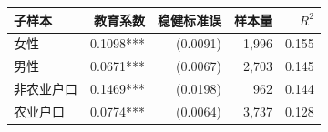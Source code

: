 \begin{tabular}{lrrrr}
\toprule
子样本 & 教育系数 & 稳健标准误 & 样本量 & $R^2$ \\
\midrule
女性 & 0.1098*** & (0.0091) & 1,996 & 0.155 \\
男性 & 0.0671*** & (0.0067) & 2,703 & 0.145 \\
非农业户口 & 0.1469*** & (0.0198) & 962 & 0.144 \\
农业户口 & 0.0774*** & (0.0064) & 3,737 & 0.128 \\
\bottomrule
\end{tabular}
